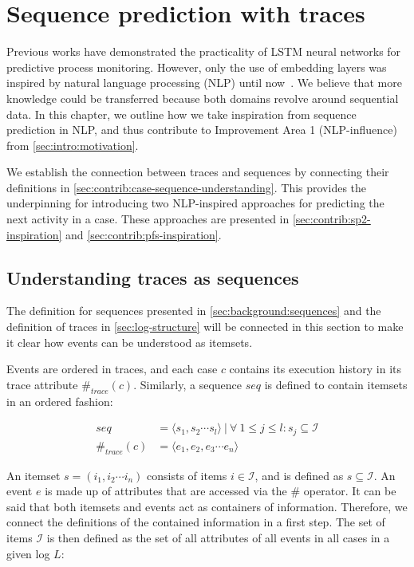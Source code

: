\chapter{Sequence prediction with traces}
\label{chap:taking-inspiration}
Previous works have demonstrated the practicality of LSTM neural networks for predictive process monitoring. However, only the use of embedding layers was inspired by natural language processing (NLP) until now~\cite{evermann2016}. We believe that more knowledge could be transferred because both domains revolve around sequential data. In this chapter, we outline how we take inspiration from sequence prediction in NLP, and thus contribute to Improvement Area 1 (NLP-influence) from \autoref{sec:intro:motivation}.

We establish the connection between traces and sequences by connecting their definitions in \autoref{sec:contrib:case-sequence-understanding}. This provides the underpinning for introducing two NLP-inspired approaches for predicting the next activity in a case. These approaches are presented in \autoref{sec:contrib:sp2-inspiration} and \autoref{sec:contrib:pfs-inspiration}.

\section{Understanding traces as sequences}\label{sec:contrib:case-sequence-understanding}
The definition for sequences presented in \autoref{sec:background:sequences} and the definition of traces in \autoref{sec:log-structure} will be connected in this section to make it clear how events can be understood as itemsets.

Events are ordered in traces, and each case $c$ contains its execution history in its trace attribute $\#_{trace}(c)$.
Similarly, a sequence $seq$ is defined to contain itemsets in an ordered fashion:

\begin{equation*}
\begin{split}
seq           &=  \langle s_1,s_2\cdots s_l \rangle\ |\ \forall\ 1 \leq j \leq l: s_j \subseteq \mathscr{I}\\
\#_{trace}(c) &= \langle e_1, e_2, e_3\cdots e_n \rangle
\end{split}
\end{equation*}

An itemset $s = (i_1, i_2 \cdots i_n)$ consists of items $i \in \mathscr{I}$, and is defined as $s \subseteq \mathscr{I}$.
An event $e$ is made up of attributes that are accessed via the $\#$ operator.
It can be said that both itemsets and events act as containers of information.
Therefore, we connect the definitions of the contained information in a first step.
The set of items $\mathscr{I}$ is then defined as the set of all attributes of all events in all cases in a given log $L$:

